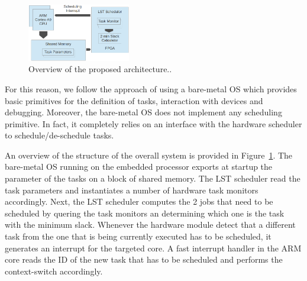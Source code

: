 \begin{figure}[h]
  \centering
  \includegraphics[width=0.4\textwidth]{fig/sched.png}
  \caption{Overview of the proposed architecture..}
  \label{fig:arch}
\end{figure}

For this reason, we follow the approach of using a bare-metal OS which
provides basic primitives for the definition of tasks, interaction
with devices and debugging. Moreover, the bare-metal OS does not
implement any scheduling primitive. In fact, it completely relies on
an interface with the hardware scheduler to schedule/de-schedule
tasks.

An overview of the structure of the overall system is provided in
Figure~\ref{fig:arch}. The bare-metal OS running on the embedded
processor exports at startup the parameter of the tasks on a block of
shared memory. The LST scheduler read the task parameters and
instantiates a number of hardware task monitors accordingly. Next, the
LST scheduler computes the 2 jobs that need to be scheduled by quering
the task monitors an determining which one is the task with the
minimum slack. Whenever the hardware module detect that a different
task from the one that is being currently executed has to be
scheduled, it generates an interrupt for the targeted core. A fast
interrupt handler in the ARM core reads the ID of the new task that
has to be scheduled and performs the context-switch accordingly.
